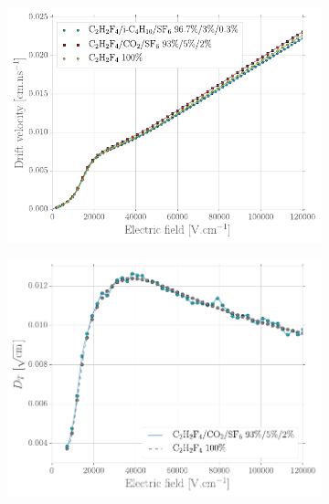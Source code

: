 	\begin{figure}[H]
		\begin{subfigure}{\linewidth}
			\centering
			\includegraphics[width = 0.6\plotwidth]{fig/chapt4/Drift_velocity.pdf}
			\caption{\label{fig:Drift-Diff:A}}
		\end{subfigure}
		\begin{subfigure}{0.5\linewidth}
			\centering
			\includegraphics[width = 0.55\plotwidth]{fig/chapt4/Diff_Trans.pdf}
			\caption{\label{fig:Drift-Diff:B}}
		\end{subfigure}
		\begin{subfigure}{0.5\linewidth}
			\centering

\end{subfigure}
\end{figure}
